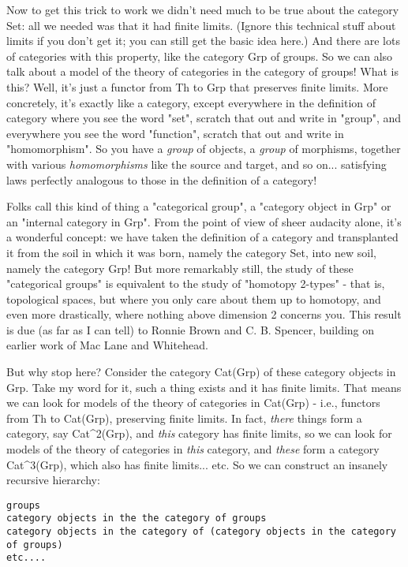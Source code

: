 Now to get this trick to work we didn't need much to be true about the
category Set: all we needed was that it had finite limits.  (Ignore this
technical stuff about limits if you don't get it; you can still get the
basic idea here.)  And there are lots of categories with this property,
like the category Grp of groups.  So we can also talk about a model of
the theory of categories in the category of groups!  What is this?
Well, it's just a functor from Th to Grp that preserves finite limits.
More concretely, it's exactly like a category, except everywhere in the
definition of category where you see the word "set", scratch that out
and write in "group", and everywhere you see the word "function",
scratch that out and write in "homomorphism".  So you have a
\emph{group} of objects, a \emph{group} of morphisms, together with
various \emph{homomorphisms} like the source and target, and so
on... satisfying laws perfectly analogous to those in the definition of
a category!

Folks call this kind of thing a "categorical group", a "category
object in Grp" or an "internal category in Grp".  From the point of
view of sheer audacity alone, it's a wonderful concept: we have taken
the definition of a category and transplanted it from the soil in
which it was born, namely the category Set, into new soil, namely the
category Grp!  But more remarkably still, the study of these
"categorical groups" is equivalent to the study of "homotopy 2-types"
- that is, topological spaces, but where you only care about them up
to homotopy, and even more drastically, where nothing above dimension
2 concerns you.  This result is due (as far as I can tell) to Ronnie
Brown and C. B. Spencer, building on earlier work of Mac Lane and
Whitehead.

But why stop here?  Consider the category Cat(Grp) of these
category objects in Grp.  Take my word for it, such a thing exists and
it has finite limits.  That means we can look for models of the theory
of categories in Cat(Grp) - i.e., functors from Th to Cat(Grp),
preserving finite limits.  In fact, \emph{there} things form a
category, say Cat^{2}(Grp), and \emph{this} category has
finite limits, so we can look for models of the theory of categories
in \emph{this} category, and \emph{these} form a category
Cat^{3}(Grp), which also has finite limits... etc.  So we can
construct an insanely recursive hierarchy:

\begin{verbatim}
groups
category objects in the the category of groups
category objects in the category of (category objects in the category of groups)
etc....

\end{verbatim}
    
